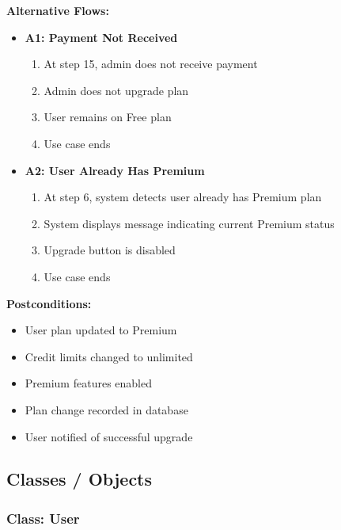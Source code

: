 \documentclass[12pt,a4paper]{article}
\begin{document}
\textbf{Alternative Flows:}
\begin{itemize}
    \item \textbf{A1: Payment Not Received}
        \begin{enumerate}
            \item At step 15, admin does not receive payment
            \item Admin does not upgrade plan
            \item User remains on Free plan
            \item Use case ends
        \end{enumerate}
    \item \textbf{A2: User Already Has Premium}
        \begin{enumerate}
            \item At step 6, system detects user already has Premium plan
            \item System displays message indicating current Premium status
            \item Upgrade button is disabled
            \item Use case ends
        \end{enumerate}
\end{itemize}

\textbf{Postconditions:}
\begin{itemize}
    \item User plan updated to Premium
    \item Credit limits changed to unlimited
    \item Premium features enabled
    \item Plan change recorded in database
    \item User notified of successful upgrade
\end{itemize}

\subsection{Classes / Objects}

\subsubsection{Class: User}
\end{document}
